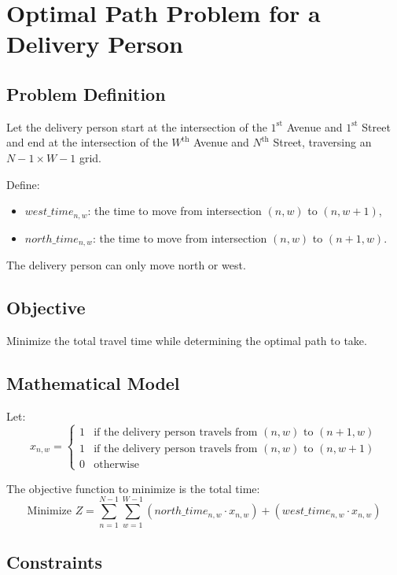 \documentclass{article}
\begin{document}
\section*{Optimal Path Problem for a Delivery Person}

\subsection*{Problem Definition}

Let the delivery person start at the intersection of the \(1^{\text{st}}\) Avenue and \(1^{\text{st}}\) Street and end at the intersection of the \(W^{\text{th}}\) Avenue and \(N^{\text{th}}\) Street, traversing an \(N-1 \times W-1\) grid. 

Define:
\begin{itemize}
    \item \(west\_time_{n,w}\): the time to move from intersection \((n,w)\) to \((n,w+1)\),
    \item \(north\_time_{n,w}\): the time to move from intersection \((n,w)\) to \((n+1,w)\).
\end{itemize}

The delivery person can only move north or west.

\subsection*{Objective}

Minimize the total travel time while determining the optimal path to take. 

\subsection*{Mathematical Model}

Let:
\[
x_{n,w} = 
\begin{cases}
1 & \text{if the delivery person travels from } (n,w) \text{ to } (n+1,w) \\
1 & \text{if the delivery person travels from } (n,w) \text{ to } (n,w+1) \\
0 & \text{otherwise}
\end{cases}
\]

The objective function to minimize is the total time:
\[
\text{Minimize } Z = \sum_{n=1}^{N-1} \sum_{w=1}^{W-1} (north\_time_{n,w} \cdot x_{n,w}) + (west\_time_{n,w} \cdot x_{n,w})
\]

\subsection*{Constraints}
\end{document}
